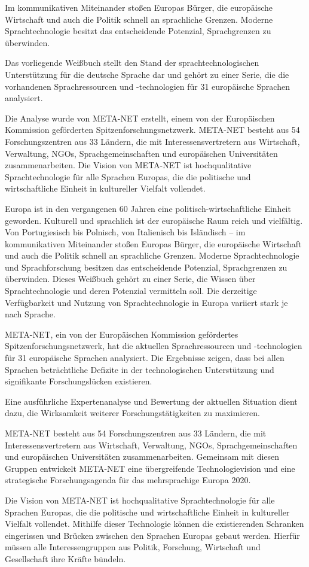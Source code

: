 Im kommunikativen Miteinander stoßen Europas Bürger, die europäische Wirtschaft und auch die Politik schnell an sprachliche Grenzen. Moderne Sprachtechnologie besitzt das entscheidende Potenzial, Sprachgrenzen zu überwinden. 

Das vorliegende Weißbuch stellt den Stand der sprachtechnologischen Unterstützung für die deutsche Sprache dar und gehört zu einer Serie, die die vorhandenen Sprachressourcen und -technologien für 31 europäische Sprachen analysiert.

Die Analyse wurde von META-NET erstellt, einem von der Europäischen Kommission geförderten Spitzenforschungsnetzwerk. 
META-NET besteht aus 54 Forschungszentren aus 33 Ländern, die mit Interessensvertretern aus Wirtschaft, Verwaltung, NGOs, Sprachgemeinschaften und europäischen Universitäten zusammenarbeiten. Die Vision von META-NET ist hochqualitative Sprachtechnologie für alle Sprachen Europas, die die politische und wirtschaftliche Einheit in kultureller Vielfalt vollendet. 



Europa ist in den vergangenen 60 Jahren eine politisch-wirtschaftliche Einheit geworden. Kulturell und sprachlich ist der europäische Raum reich und vielfältig. Von Portugiesisch bis Polnisch, von Italienisch bis Isländisch -- im kommunikativen Miteinander stoßen Europas Bürger, die europäische Wirtschaft und auch die Politik schnell an sprachliche Grenzen. 
Moderne Sprachtechnologie und Sprachforschung besitzen das entscheidende Potenzial, Sprachgrenzen zu überwinden. 
Dieses Weißbuch gehört zu einer Serie, die Wissen über Sprachtechnologie und deren Potenzial vermitteln soll. Die derzeitige Verfügbarkeit und Nutzung von Sprachtechnologie in Europa variiert stark je nach Sprache. 

META-NET, ein von der Europäischen Kommission gefördertes Spitzenforschungsnetzwerk, hat die aktuellen Sprachressourcen und -technologien für 31 europäische Sprachen analysiert. Die Ergebnisse zeigen, dass bei allen Sprachen beträchtliche Defizite in der technologischen Unterstützung und signifikante Forschungslücken existieren. 

Eine ausführliche Expertenanalyse und Bewertung der aktuellen Situation dient dazu, die Wirksamkeit weiterer Forschungstätigkeiten zu maximieren.

META-NET besteht aus 54 Forschungszentren aus 33 Ländern, die mit Interessensvertretern aus Wirtschaft, Verwaltung, NGOs, Sprachgemeinschaften und europäischen Universitäten zusammenarbeiten. Gemeinsam mit diesen Gruppen entwickelt META-NET eine übergreifende Technologievision und eine strategische Forschungsagenda für das mehrsprachige Europa 2020.

Die Vision von META-NET ist hochqualitative Sprachtechnologie für alle Sprachen Europas, die die politische und wirtschaftliche Einheit in kultureller Vielfalt vollendet. Mithilfe dieser Technologie können die existierenden Schranken eingerissen und Brücken zwischen den Sprachen Europas gebaut werden. Hierfür müssen alle Interessengruppen aus Politik, Forschung, Wirtschaft und Gesellschaft ihre Kräfte bündeln.

